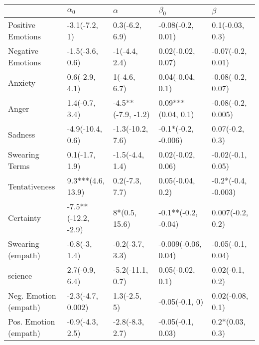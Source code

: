 \begin{tabular}{lllll}
\toprule
{} &           $\alpha_0$ &            $\alpha$ &            $\beta_0$ &              $\beta$ \\
\midrule
Positive Emotions     &        -3.1(-7.2, 1) &      0.3(-6.2, 6.9) &    -0.08(-0.2, 0.01) &      0.1(-0.03, 0.3) \\
Negative Emotions     &      -1.5(-3.6, 0.6) &       -1(-4.4, 2.4) &    0.02(-0.02, 0.07) &    -0.07(-0.2, 0.01) \\
Anxiety               &       0.6(-2.9, 4.1) &        1(-4.6, 6.7) &     0.04(-0.04, 0.1) &    -0.08(-0.2, 0.07) \\
Anger                 &       1.4(-0.7, 3.4) &  -4.5**(-7.9, -1.2) &   0.09***(0.04, 0.1) &   -0.08(-0.2, 0.005) \\
Sadness               &     -4.9(-10.4, 0.6) &    -1.3(-10.2, 7.6) &  -0.1*(-0.2, -0.006) &      0.07(-0.2, 0.3) \\
Swearing Terms        &       0.1(-1.7, 1.9) &     -1.5(-4.4, 1.4) &    0.02(-0.02, 0.06) &    -0.02(-0.1, 0.05) \\
Tentativeness         &    9.3***(4.6, 13.9) &      0.2(-7.3, 7.7) &     0.05(-0.04, 0.2) &  -0.2*(-0.4, -0.003) \\
Certainty             &  -7.5**(-12.2, -2.9) &       8*(0.5, 15.6) &  -0.1**(-0.2, -0.04) &     0.007(-0.2, 0.2) \\
Swearing (empath)     &        -0.8(-3, 1.4) &     -0.2(-3.7, 3.3) &  -0.009(-0.06, 0.04) &    -0.05(-0.1, 0.04) \\
science               &       2.7(-0.9, 6.4) &    -5.2(-11.1, 0.7) &     0.05(-0.02, 0.1) &      0.02(-0.1, 0.2) \\
Neg. Emotion (empath) &    -2.3(-4.7, 0.002) &        1.3(-2.5, 5) &       -0.05(-0.1, 0) &     0.02(-0.08, 0.1) \\
Pos. Emotion (empath) &      -0.9(-4.3, 2.5) &     -2.8(-8.3, 2.7) &    -0.05(-0.1, 0.03) &      0.2*(0.03, 0.3) \\
\bottomrule
\end{tabular}
